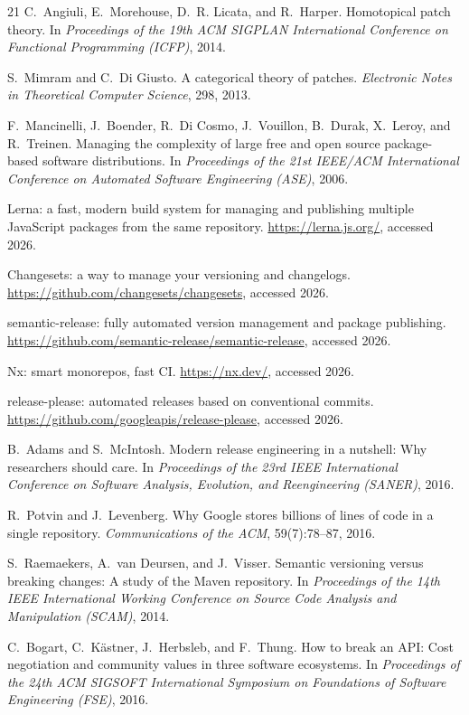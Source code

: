 \documentclass[sigconf,nonacm]{acmart}
\begin{document}
\begin{thebibliography}{21}
C.~Angiuli, E.~Morehouse, D.~R. Licata, and R.~Harper.
Homotopical patch theory.
In \emph{Proceedings of the 19th ACM SIGPLAN International Conference
on Functional Programming (ICFP)}, 2014.

S.~Mimram and C.~Di Giusto.
A categorical theory of patches.
\emph{Electronic Notes in Theoretical Computer Science}, 298, 2013.

F.~Mancinelli, J.~Boender, R.~Di Cosmo, J.~Vouillon, B.~Durak,
X.~Leroy, and R.~Treinen.
Managing the complexity of large free and open source package-based
software distributions.
In \emph{Proceedings of the 21st IEEE/ACM International Conference on
Automated Software Engineering (ASE)}, 2006.

Lerna: a fast, modern build system for managing and publishing multiple
JavaScript packages from the same repository.
\url{https://lerna.js.org/}, accessed 2026.

Changesets: a way to manage your versioning and changelogs.
\url{https://github.com/changesets/changesets}, accessed 2026.

semantic-release: fully automated version management and package
publishing.
\url{https://github.com/semantic-release/semantic-release},
accessed 2026.

Nx: smart monorepos, fast CI.
\url{https://nx.dev/}, accessed 2026.

release-please: automated releases based on conventional commits.
\url{https://github.com/googleapis/release-please}, accessed 2026.

B.~Adams and S.~McIntosh.
Modern release engineering in a nutshell: Why researchers should care.
In \emph{Proceedings of the 23rd IEEE International Conference on
Software Analysis, Evolution, and Reengineering (SANER)}, 2016.

R.~Potvin and J.~Levenberg.
Why Google stores billions of lines of code in a single repository.
\emph{Communications of the ACM}, 59(7):78--87, 2016.

S.~Raemaekers, A.~van Deursen, and J.~Visser.
Semantic versioning versus breaking changes: A study of the Maven
repository.
In \emph{Proceedings of the 14th IEEE International Working Conference
on Source Code Analysis and Manipulation (SCAM)}, 2014.

C.~Bogart, C.~K\"astner, J.~Herbsleb, and F.~Thung.
How to break an API: Cost negotiation and community values in three
software ecosystems.
In \emph{Proceedings of the 24th ACM SIGSOFT International Symposium on
Foundations of Software Engineering (FSE)}, 2016.


\end{thebibliography}
\end{document}
